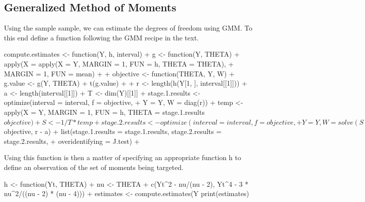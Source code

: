 \documentclass[a4paper]{article}
\renewcommand{\~}{\perispomeni}%
\begin{document}
\subsection{Generalized Method of Moments}
Using the sample sample, we can estimate the degrees of freedom using GMM.  To this end define a
function following the GMM recipe in the text.  
\begin{Schunk}
\begin{Sinput}
 compute.estimates <- function(Y, h, interval) {
+     g <- function(Y, THETA) {
+         apply(X = apply(X = Y, MARGIN = 1, FUN = h, THETA = THETA), 
+             MARGIN = 1, FUN = mean)
+     }
+     objective <- function(THETA, Y, W) {
+         g.value <- g(Y, THETA)
+         t(g.value) %
+     }
+     r <- length(h(Y[1, ], interval[[1]]))
+     a <- length(interval[[1]])
+     T <- dim(Y)[[1]]
+     stage.1.results <- optimize(interval = interval, f = objective, 
+         Y = Y, W = diag(r))
+     temp <- apply(X = Y, MARGIN = 1, FUN = h, THETA = stage.1.results$objective)
+     S <- 1/T * temp %
+     stage.2.results <- optimize(interval = interval, f = objective, 
+         Y = Y, W = solve(S))
+     J.test <- 1 - pchisq(T * stage.2.results$objective, r - a)
+     list(stage.1.results = stage.1.results, stage.2.results = stage.2.results, 
+         overidentifying = J.test)
+ }
\end{Sinput}
\end{Schunk}
Using this function is then a matter of specifying an appropriate function h to define an observation of
the set of moments being targeted.
\begin{Schunk}
\begin{Sinput}
 h <- function(Yt, THETA) {
+     nu <- THETA
+     c(Yt^2 - nu/(nu - 2), Yt^4 - 3 * nu^2/((nu - 2) * (nu - 4)))
+ }
 estimates <- compute.estimates(Y %
 print(estimates)
\end{Sinput}
\end{Schunk}
\end{document}
